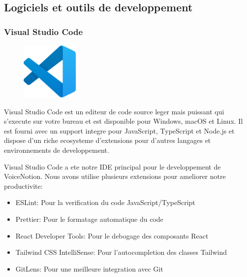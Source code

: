 \subsection{Logiciels et outils de developpement}

\subsubsection{Visual Studio Code}
\begin{figure}
    \centering
    \includegraphics[width=0.25\textwidth]{assets/docs/vscode.png}
\end{figure}
Visual Studio Code est un editeur de code source leger mais puissant qui s'execute sur votre bureau et est disponible pour Windows, macOS et Linux. Il est fourni avec un support integre pour JavaScript, TypeScript et Node.js et dispose d'un riche ecosysteme d'extensions pour d'autres langages et environnements de developpement.

Visual Studio Code a ete notre IDE principal pour le developpement de VoiceNotion. Nous avons utilise plusieurs extensions pour ameliorer notre productivite:

\begin{itemize}
    \item ESLint: Pour la verification du code JavaScript/TypeScript
    \item Prettier: Pour le formatage automatique du code
    \item React Developer Tools: Pour le debogage des composants React
    \item Tailwind CSS IntelliSense: Pour l'autocompletion des classes Tailwind
    \item GitLens: Pour une meilleure integration avec Git
\end{itemize}

